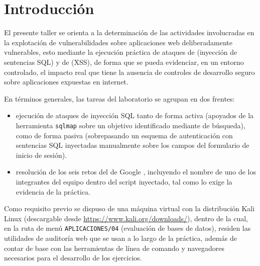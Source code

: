 \section*{Introducción}

El presente taller se orienta a la determinación de las actividades involucradas en la explotación de vulnerabilidades sobre aplicaciones web deliberadamente vulnerables, esto mediante la ejecución práctica de ataques de  (inyección de sentencias SQL) y de  (XSS), de forma que se pueda evidenciar, en un entorno controlado, el impacto real que tiene la ausencia de controles de desarrollo seguro sobre aplicaciones expuestas en internet.

En términos generales, las tareas del laboratorio se agrupan en dos frentes:

\begin{itemize}
  \item {} ejecución de ataques de inyección SQL tanto de forma activa (apoyados de la herramienta \texttt{sqlmap} sobre un objetivo identificado mediante  de búsqueda), como de forma pasiva (sobrepasando un esquema de autenticación con sentencias SQL inyectadas manualmente sobre los campos del formulario de inicio de sesión).
  \item {} resolución de los seis retos del  de Google \cite{xss-game}, incluyendo el nombre de uno de los integrantes del equipo dentro del script inyectado, tal como lo exige la evidencia de la práctica.
\end{itemize}

Como requisito previo se dispuso de una máquina virtual con la distribución Kali Linux (descargable desde \url{https://www.kali.org/downloads/}), dentro de la cual, en la ruta de menú \texttt{APLICACIONES/04} (evaluación de bases de datos), residen las utilidades de auditoría web que se usan a lo largo de la práctica, además de contar de base con las herramientas de línea de comando y navegadores necesarios para el desarrollo de los ejercicios.
